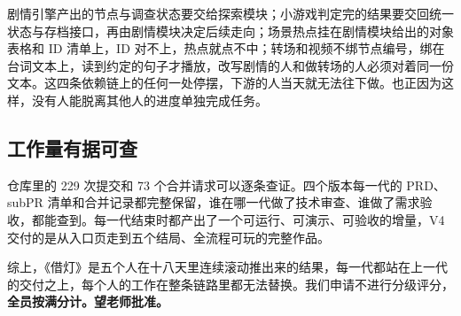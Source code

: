剧情引擎产出的节点与调查状态要交给探索模块；小游戏判定完的结果要交回统一状态与存档接口，再由剧情模块决定后续走向；场景热点挂在剧情模块给出的对象表格和 ID 清单上，ID 对不上，热点就点不中；转场和视频不绑节点编号，绑在台词文本上，读到约定的句子才播放，改写剧情的人和做转场的人必须对着同一份文本。这四条依赖链上的任何一处停摆，下游的人当天就无法往下做。也正因为这样，没有人能脱离其他人的进度单独完成任务。

\subsection{工作量有据可查}

仓库里的 229 次提交和 73 个合并请求可以逐条查证。四个版本每一代的 PRD、subPR 清单和合并记录都完整保留，谁在哪一代做了技术审查、谁做了需求验收，都能查到。每一代结束时都产出了一个可运行、可演示、可验收的增量，V4 交付的是从入口页走到五个结局、全流程可玩的完整作品。

\medskip

综上，《借灯》是五个人在十八天里连续滚动推出来的结果，每一代都站在上一代的交付之上，每个人的工作在整条链路里都无法替换。我们申请不进行分级评分，\textbf{全员按满分计。望老师批准。}
